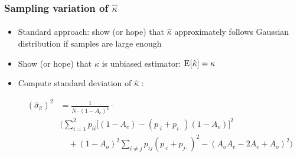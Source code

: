 \documentclass[t]{beamer} %
\begin{document}
\begin{frame}
  \frametitle{Sampling variation of $\hat{\kappa}$}
  \framesubtitle{\citep{Fleiss:Cohen:Everitt:69,Krenn:Evert:Zinsmeister:04}}

  \begin{itemize}
  \item<1-> Standard approach: show (or hope) that $\hat{\kappa}$ approximately
    follows Gaussian distribution if samples are large enough
  \item<2-> Show (or hope) that $\hat{\kappa}$ is unbiased estimator: $\mathrm{E}_{}[\hat{\kappa}] = \kappa$
  \item<3-> Compute standard deviation of $\hat{\kappa}$
    \citep{Fleiss:Cohen:Everitt:69}:
    \begin{footnotesize}
    \begin{equation*}
      \begin{split}
        (\hat{\sigma}_{\hat{\kappa}})^2 &= 
        \frac{1}{N\cdot (1 - A_e)^4} \cdot \\
        & \Biggl(
        \sum_{i=1}^2 p_{ii} \bigl[
        (1 - A_e) - (p_{\cdot i} + p_{i\cdot})(1 - A_o)
        \bigr]^2 \\
        & \quad + (1 - A_o)^2 \sum_{i\neq j}
        p_{ij} (p_{\cdot i} + p_{j\cdot})^2 
        - (A_o A_e - 2 A_e + A_o)^2 \Biggr)
      \end{split}
    \end{equation*}
    \end{footnotesize}
  \end{itemize}
\end{frame}
\end{document}
